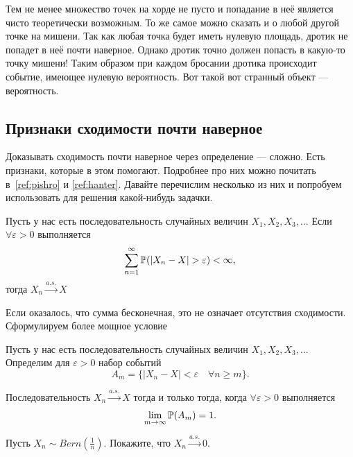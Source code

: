 \documentclass[12pt, a4paper, oneside]{article}
\begin{document}
Тем не менее множество точек на хорде не пусто и попадание в неё является чисто теоретически возможным. То же самое можно сказать и о любой другой точке на мишени. Так как любая точка будет иметь нулевую площадь, дротик не попадет в неё почти наверное. Однако дротик точно должен попасть в какую-то точку мишени! Таким образом при каждом бросании дротика происходит событие, имеющее нулевую вероятность. Вот такой вот странный объект --- вероятность. 

\subsection{Признаки сходимости почти наверное}

Доказывать сходимость почти наверное через определение --- сложно. Есть признаки, которые в этом помогают. Подробнее про них можно почитать в~\ref{ref:pishro} и \ref{ref:hanter}. Давайте перечислим несколько из них и попробуем использовать для решения какой-нибудь задачки.

\begin{theorem} 
Пусть у нас есть последовательность случайных величин $X_1, X_2, X_3, \ldots$ Если $\forall \varepsilon > 0$ выполняется  $$\sum_{n=1}^{\infty} \mathbb{P}(|X_n - X| > \varepsilon) < \infty, $$ тогда $X_n \overset{a.s.}{\to} X$
\end{theorem} 

Если оказалось, что сумма бесконечная, это не означает отсутствия сходимости. Сформулируем более мощное условие 

\begin{theorem} 
Пусть у нас есть последовательность случайных величин $X_1, X_2, X_3, \ldots$ Определим для $\varepsilon > 0$ набор событий $$A_m = \{|X_n - X| < \varepsilon  \quad \forall n \ge m\}.$$ 

Последовательность $X_n \overset{a.s.}{\to} X$ тогда и только тогда, когда $\forall \varepsilon > 0$  выполняется $$\lim_{m \to \infty} \mathbb{P}(A_m) = 1.$$
\end{theorem} 

\begin{problem}{}
Пусть $X_n \sim Bern(\frac{1}{n})$. Покажите, что $X_n \overset{a.s.}{\to} 0.$
\end{problem} 
\end{document}
